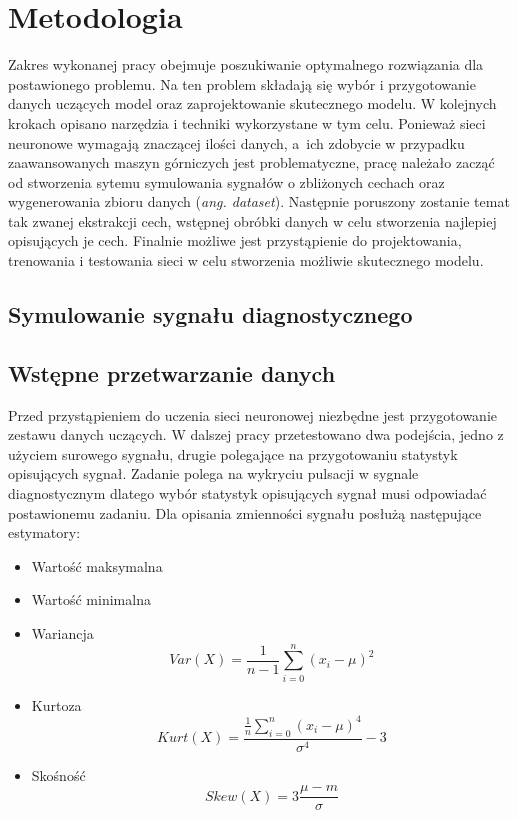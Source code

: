 \documentclass[inzynierska]{pwr_wmat_praca_dyplomowa}
\theoremstyle{plain}
\numberwithin{theorem}{chapter}
\theoremstyle{definition}
\numberwithin{theorem}{chapter}
\begin{document}
\chapter{Metodologia}
Zakres wykonanej pracy obejmuje poszukiwanie optymalnego rozwiązania dla postawionego problemu. Na ten problem składają się wybór i przygotowanie danych uczących model oraz zaprojektowanie skutecznego modelu. 
W kolejnych krokach opisano narzędzia i techniki wykorzystane w tym celu. Ponieważ sieci neuronowe wymagają znaczącej ilości danych, a~ich zdobycie w przypadku zaawansowanych maszyn górniczych jest problematyczne, pracę należało zacząć od stworzenia sytemu symulowania sygnałów o zbliżonych cechach oraz wygenerowania zbioru danych (\textit{ang. dataset}). Następnie poruszony zostanie temat tak zwanej ekstrakcji cech, wstępnej obróbki danych w celu stworzenia najlepiej opisujących je cech. Finalnie możliwe jest przystąpienie do projektowania, trenowania i testowania sieci w celu stworzenia możliwie skutecznego modelu.
\section{Symulowanie sygnału diagnostycznego}
\section{Wstępne przetwarzanie danych}
Przed przystąpieniem do uczenia sieci neuronowej niezbędne jest przygotowanie zestawu danych uczących. W dalszej pracy przetestowano dwa podejścia, jedno z użyciem surowego sygnału, drugie polegające na przygotowaniu statystyk opisujących sygnał. Zadanie polega na wykryciu pulsacji w sygnale diagnostycznym dlatego wybór statystyk opisujących sygnał musi odpowiadać postawionemu zadaniu. Dla opisania zmienności sygnału posłużą następujące estymatory:
\begin{itemize}
	\item Wartość maksymalna
	\item Wartość minimalna
	\item Wariancja
	\begin{equation}
	Var (X) = \frac{1}{n-1} \sum_{i=0}^{n} \left(x_{i} - \mu\right)^{2}
	\end{equation}
	\item Kurtoza
	\begin{equation}
	Kurt (X) = \frac{\frac{1}{n} \sum_{i=0}^{n}\left(x_{i} - \mu\right)^{4}}{\sigma^{4}} - 3
	\end{equation}
	\item Skośność
	\begin{equation}
	Skew (X) = 3 \frac{\mu - m}{\sigma}
	\end{equation}
\end{itemize}
\end{document}
